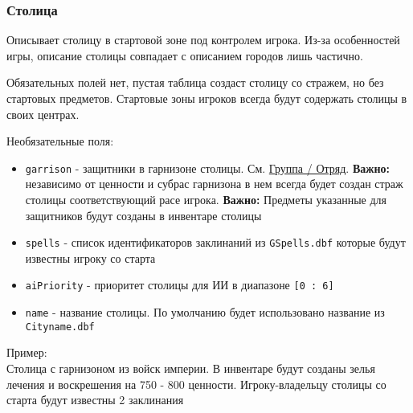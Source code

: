 \subsubsection{Столица}
\label{capital}
Описывает столицу в стартовой зоне под контролем игрока. Из-за особенностей игры, описание столицы совпадает с описанием городов лишь частично.

Обязательных полей нет, пустая таблица создаст столицу со стражем, но без стартовых предметов. Стартовые зоны игроков всегда будут содержать столицы в своих центрах.

Необязательные поля:
\begin{itemize}
\item \texttt{garrison} - защитники в гарнизоне столицы. См. \hyperref[group]{Группа / Отряд}. \textbf{Важно:} независимо от ценности и субрас гарнизона в нем всегда будет создан страж столицы соответствующий расе игрока. \textbf{Важно:} Предметы указанные для защитников будут созданы в инвентаре столицы
\item \texttt{spells} - список идентификаторов заклинаний из \texttt{GSpells.dbf} которые будут известны игроку со старта
\item \texttt{aiPriority} - приоритет столицы для ИИ в диапазоне \texttt{[0 : 6]}
\item \texttt{name} - название столицы. По умолчанию будет использовано название из \texttt{Cityname.dbf}
\end{itemize}

Пример:\\
Столица с гарнизоном из войск империи.
В инвентаре будут созданы зелья лечения и воскрешения на 750 - 800 ценности.
Игроку-владельцу столицы со старта будут известны 2 заклинания

\begin{figure}[H]

\end{figure}